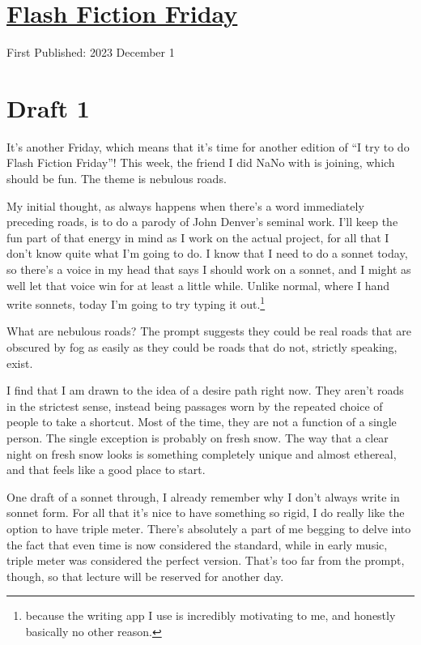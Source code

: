 \documentclass[12pt]{article}[titlepage]
\newcommand{\say}[1]{``#1''}
\newcommand{\1}{\={a}}
\newcommand{\2}{\={e}}
\newcommand{\3}{\={\i}}
\newcommand{\4}{\=o}
\newcommand{\5}{\=u}
\newcommand{\6}{\={A}}
\renewcommand{\,}{\textsuperscript{,}}
\begin{document}
\doublespacing
\section{\href{flash-fiction-229.html}{Flash Fiction Friday}}
First Published: 2023 December 1

\section{Draft 1}
It's another Friday, which means that it's time for another edition of \say{I try to do Flash Fiction Friday}!
This week, the friend I did NaNo with is joining, which should be fun.
The theme is nebulous roads.
 
My initial thought, as always happens when there's a word immediately preceding roads, is to do a parody of John Denver's seminal work.
I'll keep the fun part of that energy in mind as I work on the actual project, for all that I don't know quite what I'm going to do.
I know that I need to do a sonnet today, so there's a voice in my head that says I should work on a sonnet, and I might as well let that voice win for at least a little while.
Unlike normal, where I hand write sonnets, today I'm going to try typing it out.\footnote{because the writing app I use is incredibly motivating to me, and honestly basically no other reason.}
 
What are nebulous roads?
The prompt suggests they could be real roads that are obscured by fog as easily as they could be roads that do not, strictly speaking, exist.
 
I find that I am drawn to the idea of a desire path right now.
They aren't roads in the strictest sense, instead being passages worn by the repeated choice of people to take a shortcut.
Most of the time, they are not a function of a single person.
The single exception is probably on fresh snow.
The way that a clear night on fresh snow looks is something completely unique and almost ethereal, and that feels like a good place to start.
 
One draft of a sonnet through, I already remember why I don't always write in sonnet form.
For all that it's nice to have something so rigid, I do really like the option to have triple meter.
There's absolutely a part of me begging to delve into the fact that even time is now considered the standard, while in early music, triple meter was considered the perfect version.
That's too far from the prompt, though, so that lecture will be reserved for another day.
 
\end{document}
